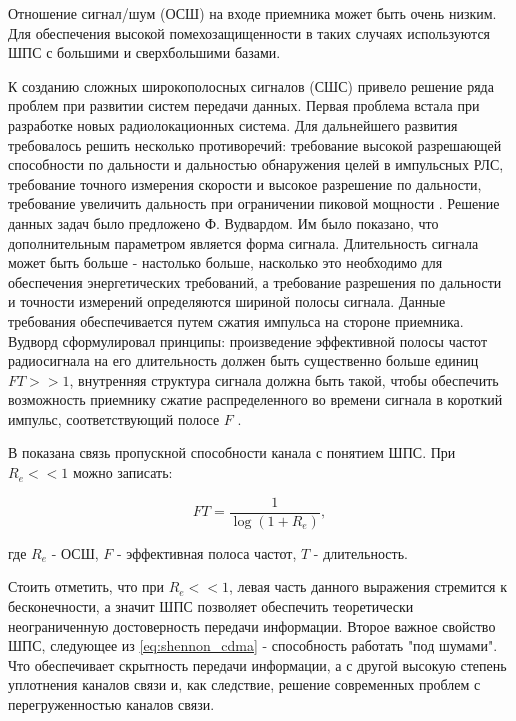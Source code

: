 Отношение сигнал/шум (ОСШ) на входе приемника может быть очень низким. Для обеспечения высокой помехозащищенности 
в таких случаях используются ШПС с большими и сверхбольшими базами.

К созданию сложных широкополосных сигналов (СШС) привело решение ряда проблем при развитии систем передачи данных.
Первая проблема встала при разработке новых радиолокационных система. Для дальнейшего развития требовалось
решить несколько противоречий: требование высокой разрешающей способности по дальности и дальностью обнаружения
целей в импульсных РЛС, требование точного измерения скорости и высокое разрешение по дальности, требование
увеличить дальность при ограничении пиковой мощности \cite{gantmaher-book}. Решение данных задач было предложено
Ф. Вудвардом. Им было показано, что дополнительным параметром является форма сигнала. Длительность сигнала
может быть больше - настолько больше, насколько это необходимо для обеспечения энергетических требований, а требование
разрешения по дальности и точности измерений определяются шириной полосы сигнала. Данные требования обеспечивается
путем сжатия импульса на стороне приемника. Вудворд сформулировал принципы: произведение эффективной полосы частот
радиосигнала на его длительность должен быть существенно больше единиц ${FT>>1}$, внутренняя структура сигнала
должна быть такой, чтобы обеспечить возможность приемнику сжатие распределенного во времени сигнала в короткий импульс,
соответствующий полосе ${F}$ \cite{gantmaher-book}.

В \cite{gantmaher-book} показана связь пропускной способности канала с понятием ШПС. При ${R_e<<1}$ можно записать:
\begin{center}
\begin{equation}
	FT = \frac{1}{\log(1+R_e)}, \nonumber
\end{equation}
\end{center}
где ${R_e}$ - ОСШ, ${F}$ - эффективная полоса частот, ${T}$ - длительность.

Стоить отметить, что при ${R_e<<1}$, левая часть данного выражения стремится к бесконечности, а значит
ШПС позволяет обеспечить теоретически неограниченную достоверность передачи информации. Второе важное свойство
ШПС, следующее из \ref{eq:shennon_cdma} - способность работать "под шумами". Что обеспечивает скрытность
передачи информации, а с другой высокую степень уплотнения каналов связи и, как следствие, решение современных проблем
с перегруженностью каналов связи.

